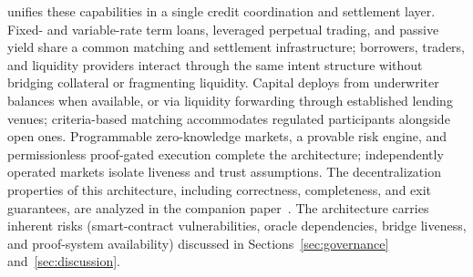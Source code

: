 \daloc{} unifies these capabilities in a single credit coordination and settlement layer. Fixed- and variable-rate term loans, leveraged perpetual trading, and passive yield share a common matching and settlement infrastructure; borrowers, traders, and liquidity providers interact through the same intent structure without bridging collateral or fragmenting liquidity. Capital deploys from underwriter balances when available, or via liquidity forwarding through established lending venues; criteria-based matching accommodates regulated participants alongside open ones. Programmable zero-knowledge markets, a provable risk engine, and permissionless proof-gated execution complete the architecture; independently operated markets isolate liveness and trust assumptions. The decentralization properties of this architecture, including correctness, completeness, and exit guarantees, are analyzed in the companion paper~\cite{daloc-decent2026}. The architecture carries inherent risks (smart-contract vulnerabilities, oracle dependencies, bridge liveness, and proof-system availability) discussed in Sections~\ref{sec:governance} and~\ref{sec:discussion}.
